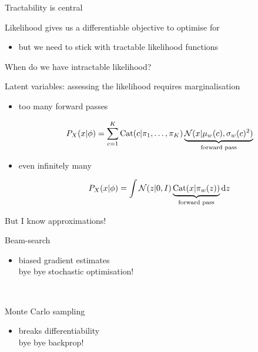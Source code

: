 \documentclass[14pt]{beamer}
\begin{document}
\begin{frame}{Tractability is central}

Likelihood gives us a differentiable objective to optimise for
\begin{itemize}
	\item but we need to stick with \alert{tractable} likelihood functions
\end{itemize}




\end{frame}

\begin{frame}{When do we have intractable likelihood?}

Latent variables: assessing the likelihood requires marginalisation
\begin{itemize}
	\item too many forward passes
	\begin{small}
	\begin{equation*}
	P_X(x|\phi) = \sum_{c=1}^K \operatorname{Cat}(c|\pi_1, \ldots, \pi_K) \underbrace{\mathcal N(x|\mu_w(c), \sigma_w(c)^2)}_{\text{forward pass}}
	\end{equation*}
	\end{small}
	\item even infinitely many
	\begin{small}
	\begin{equation*}
	P_X(x|\phi) = \int \mathcal N(z|0, I) \underbrace{\operatorname{Cat}(x|\pi_w(z))}_{\text{forward pass}} \mathrm{d}z
	\end{equation*}
	\end{small}
\end{itemize}

\end{frame}


\begin{frame}{But I know approximations!}

Beam-search %
\begin{itemize}
	\item \alert{biased gradient estimates}\\
	bye bye stochastic optimisation!
\end{itemize}

~

Monte Carlo sampling
\begin{itemize}
	\item \alert{breaks differentiability}\\
	bye bye backprop!
\end{itemize}

\end{frame}
\end{document}
